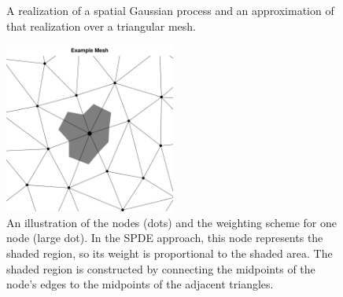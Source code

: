 \documentclass[]{interact}
\begin{document}
\begin{figure}[p]


\caption{A realization of a spatial Gaussian process and an
approximation of that realization over a triangular mesh.}
\label{surface}
\end{figure}

\begin{figure}[p]\centering
\includegraphics[width=0.5\textwidth]{figures/dual.pdf}
\caption{An illustration of the nodes (dots) and the weighting scheme for one
node (large dot). In the SPDE approach, this node represents the shaded
region, so its weight is proportional to the shaded area. The shaded region is
constructed by connecting the midpoints of the node's edges to the midpoints
of the adjacent triangles.}
\label{dual}
\end{figure}
\end{document}
